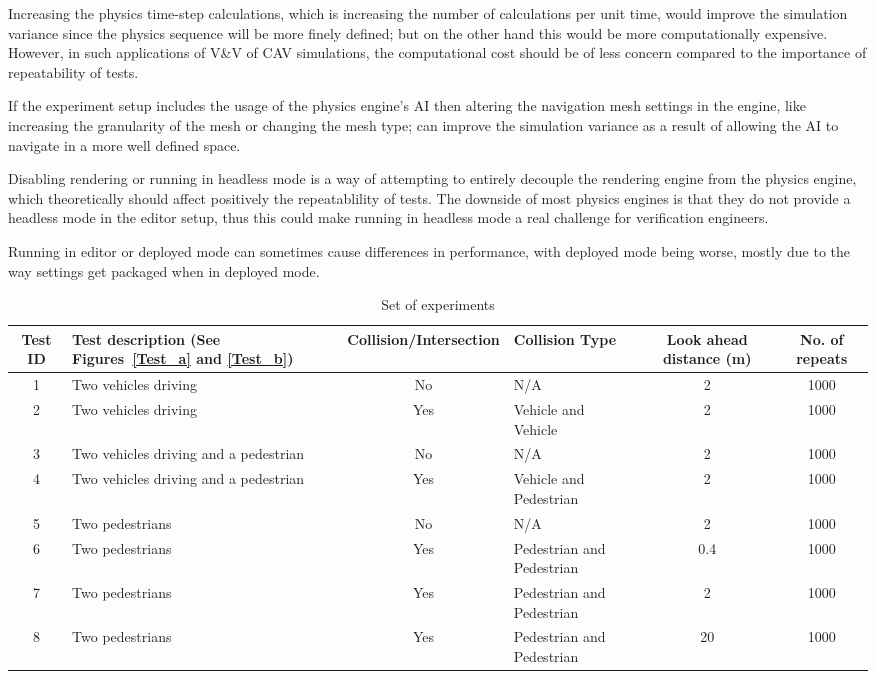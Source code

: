 Increasing the physics time-step calculations, which is increasing the number of calculations per unit time, would improve the simulation variance since the physics sequence will be more finely defined; but on the other hand this would be more computationally expensive. However, in such applications of V\&V of CAV simulations, the computational cost should be of less concern compared to the importance of repeatability of tests.

If the experiment setup includes the usage of the physics engine's AI then altering the navigation mesh settings in the engine, like increasing the granularity of the mesh or changing the mesh type; can improve the simulation variance as a result of allowing the AI to navigate in a more well defined space. 

Disabling rendering or running in headless mode is a way of attempting to entirely decouple the rendering engine from the physics engine, which theoretically should affect positively the repeatablility of tests. 
The downside of most physics engines is that they do not provide a headless mode in the editor setup, thus this could make running in headless mode a real challenge for verification engineers.

Running in editor or deployed mode can sometimes cause differences in performance, with deployed mode being worse, mostly due to the way settings get packaged when in deployed mode.

\begin{table*}[b]
\centering
\begin{tabular}{clclcc}
\toprule
Test ID & Test description (See Figures~\ref{Test_a} and \ref{Test_b}) & Collision/Intersection & Collision Type & Look ahead distance (m) & No. of repeats \\ \midrule
1       & Two vehicles driving                   & No  & N/A & 2 & 1000 \\
2       & Two vehicles driving                   & Yes & Vehicle and Vehicle & 2 & 1000 \\
3       & Two vehicles driving and a pedestrian  & No  & N/A & 2 & 1000 \\
4       & Two vehicles driving and a pedestrian  & Yes & Vehicle and Pedestrian & 2 & 1000 \\
5       & Two pedestrians                        & No  & N/A & 2 & 1000 \\
6       & Two pedestrians                        & Yes & Pedestrian and Pedestrian & 0.4 & 1000 \\
7       & Two pedestrians                        & Yes & Pedestrian and Pedestrian & 2 & 1000 \\
8       & Two pedestrians                        & Yes & Pedestrian and Pedestrian & 20 & 1000 \\
\bottomrule
\end{tabular}
\caption{Set of experiments}
\label{TableOfExperiments}
\end{table*}

